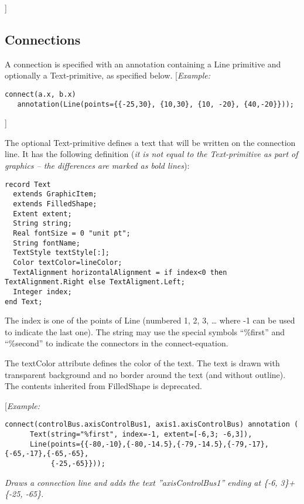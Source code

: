 {]}

\subsection{Connections}

A connection is specified with an annotation containing a Line primitive
and optionally a Text-primitive, as specified below. {[}\emph{Example:}
\begin{lstlisting}[language=modelica]
  connect(a.x, b.x)
   annotation(Line(points={{-25,30}, {10,30}, {10, -20}, {40,-20}}));
\end{lstlisting}

{]}

The optional Text-primitive defines a text that will be written on the
connection line. It has the following definition (\emph{it is not equal
to the Text-primitive as part of graphics -- the differences are marked as bold lines}):
\begin{lstlisting}[language=modelica,escapechar=!,emph={horizontalAlignment,string,index}, emphstyle=\textbf]
record Text
  extends GraphicItem;
  extends FilledShape;
  Extent extent;
  String string;
  Real fontSize = 0 "unit pt";
  String fontName;
  TextStyle textStyle[:];
  Color textColor=lineColor;
  TextAlignment horizontalAlignment = if index<0 then TextAlignment.Right else TextAligment.Left;
  Integer index;
end Text;
\end{lstlisting}

The index is one of the points of Line (numbered 1, 2, 3, \ldots{} where
-1 can be used to indicate the last one). The string may use the special
symbols ``\%first'' and ``\%second'' to indicate the connectors in the
connect-equation.

The textColor attribute defines the color of the text. The text is drawn
with transparent background and no border around the text (and without
outline). The contents inherited from FilledShape is deprecated.

{[}\emph{Example:}
\begin{lstlisting}[language=modelica]
  connect(controlBus.axisControlBus1, axis1.axisControlBus) annotation (
      Text(string="%first", index=-1, extent=[-6,3; -6,3]),
      Line(points={{-80,-10},{-80,-14.5},{-79,-14.5},{-79,-17},{-65,-17},{-65,-65},
           {-25,-65}}));
\end{lstlisting}
\emph{Draws a connection line and adds the text ''axisControlBus1''
ending at \{-6, 3\}+\{-25, -65\}.}

